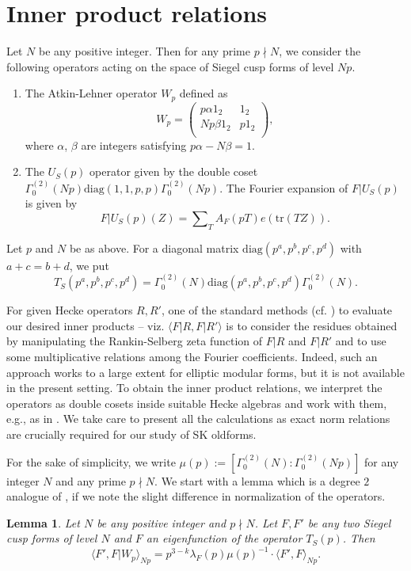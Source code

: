 \documentclass[11pt]{amsart}
\numberwithin{equation}{section}
\theoremstyle{plain}
\newtheorem{lem}[thm]{Lemma}
\theoremstyle{definition}
\newcommand{\mrm}{\mathrm}
\newcommand{\tr}{\mathrm{tr}}
\newcommand{\lan}{\langle }
\newcommand{\ran}{\rangle}
\newcommand{\sumn}{\sum \nolimits}
\newcommand{\pmat}[4]{\begin{pmatrix} #1 & #2 \\ #3 & #4 \\ \end{pmatrix} }
\begin{document}
\section{Inner product relations} \label{norm-comput}
Let $N$ be any positive integer. Then for any prime $p\nmid N$, we consider the following operators acting on the space of Siegel cusp forms of level $Np$.
\begin{enumerate}
    \item The Atkin-Lehner operator $W_p$ defined as 
    \begin{equation}\label{Wpdef}
        W_p=\pmat{p\alpha 1_2}{1_2}{Np\beta 1_2}{p1_2},
    \end{equation}
    where $\alpha$, $\beta$ are integers satisfying $p\alpha- N\beta=1$.
    \item The $U_S(p)$ operator given by the double coset $\Gamma_0^{(2)}(Np)\mrm{diag}(1,1,p,p)\Gamma_0^{(2)}(Np)$. The Fourier expansion of $F|U_S(p)$ is given by 
    \begin{equation}\label{USpdef}
        F|U_S(p)(Z)= \sumn_{T} A_F(pT)e(\tr (TZ)).
    \end{equation}
\end{enumerate}
Let $p$ and $N$ be as above. For a diagonal matrix $\mrm{diag}(p^a, p^b,p^c,p^d)$ with $a+c=b+d$, we put
\begin{equation}
    T_S(p^a, p^b,p^c,p^d)= \Gamma_0^{(2)}(N)\mrm{diag}(p^a, p^b,p^c,p^d)\Gamma_0^{(2)}(N).
\end{equation}

For given Hecke operators $R,R'$, one of the standard methods (cf. \cite{ILS}) to evaluate our desired inner products -- viz. $\lan F|R, F|R' \ran$ is to consider the residues obtained by manipulating the Rankin-Selberg zeta function of $F|R$ and $F|R'$ and to use some multiplicative relations among the Fourier coefficients. Indeed, such an approach works to a large extent for elliptic modular forms,  but it is not available in the present setting.
To obtain the inner product relations, we interpret the operators as double cosets inside suitable Hecke algebras and work with them, e.g., as in \cite{schulze2018petersson}. We take care to present all the calculations as exact norm relations are crucially required for our study of SK oldforms.

For the sake of simplicity, we write $\mu(p):=[\Gamma^{(2)}_0(N):\Gamma^{(2)}_0(Np)]$ for any integer $N$ and any prime $p\nmid N$. We start with a lemma which is a degree $2$ analogue of \cite[Thm.~6]{schulze2018petersson}, if we note the slight difference in normalization of the operators.
\begin{lem} \label{p21}
    Let $N$ be any positive integer and $p\nmid N$. Let $F,F'$ be any two Siegel cusp forms of level $N$ and $F$ an eigenfunction of the operator $T_S(p)$. Then 
    \begin{equation}
        \displaystyle \lan F', F|W_p \ran_{Np} = p^{3-k}\lambda_F(p)\mu(p)^{-1}\cdot \lan F',F \ran_{Np}.
    \end{equation}
\end{lem}
\end{document}
